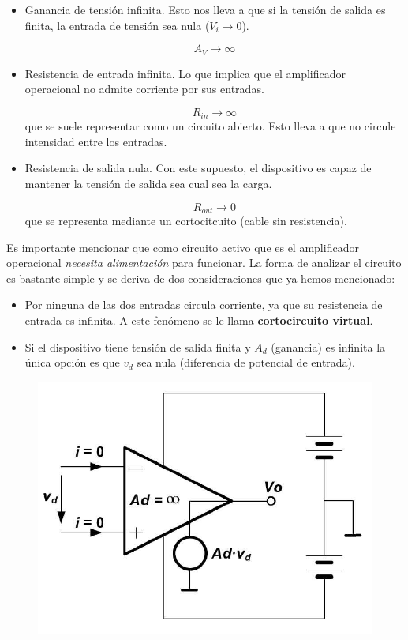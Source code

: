 \documentclass[12pt,a4paper]{article}
\numberwithin{equation}{section}
\numberwithin{figure}{section}
\begin{document}
\begin{itemize}
\item Ganancia de tensión infinita. Esto nos lleva a que si la tensión de salida es finita, la entrada de tensión sea nula ($V_i \rightarrow 0$).

$$ A_V \rightarrow \infty $$

\item Resistencia de entrada infinita. Lo que implica que el amplificador operacional no admite corriente por sus entradas.

$$ R_{in} \rightarrow \infty $$
que se suele representar como un circuito abierto. Esto lleva a que no circule intensidad entre los entradas.

\item Resistencia de salida nula. Con este supuesto, el dispositivo es capaz de mantener la tensión de salida sea cual sea la carga.

$$ R_{out} \rightarrow 0 $$
que se representa mediante un cortocitcuito (cable sin resistencia).


\end{itemize}

Es importante mencionar que como circuito activo que es el amplificador operacional \textit{necesita alimentación} para funcionar. La forma de analizar el circuito es bastante simple y se deriva de dos consideraciones que ya hemos mencionado:

\begin{itemize}
\item Por ninguna de las dos entradas circula corriente, ya que su resistencia de entrada es infinita. A este fenómeno se le llama \textbf{cortocircuito virtual}.
\item Si el dispositivo tiene tensión de salida finita y $A_d$ (ganancia) es infinita la única opción es que $v_d$ sea nula (diferencia de potencial de entrada).
\end{itemize}

\begin{figure}[h!] \centering
\includegraphics[scale=0.5]{1.1.Amplificador_ideal.png}
\end{figure}
\end{document}
